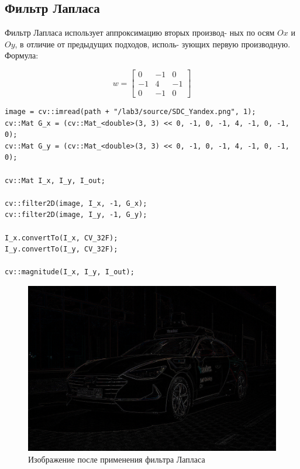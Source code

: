 \pagebreak

\subsection{Фильтр Лапласа}

Фильтр Лапласа использует аппроксимацию вторых производ-
ных по осям $Ox$ и $Oy$, в отличие от предыдущих подходов, исполь-
зующих первую производную. Формула:

\begin{equation}
    w = \begin{bmatrix}
        0 & -1 & 0 \\
        -1 & 4 & -1 \\
        0 & -1 & 0
    \end{bmatrix}
\end{equation}

\begin{lstlisting}[style=cpp_white, caption={Исходный код фильтра Лапласа}]
image = cv::imread(path + "/lab3/source/SDC_Yandex.png", 1);
cv::Mat G_x = (cv::Mat_<double>(3, 3) << 0, -1, 0, -1, 4, -1, 0, -1, 0);
cv::Mat G_y = (cv::Mat_<double>(3, 3) << 0, -1, 0, -1, 4, -1, 0, -1, 0);

cv::Mat I_x, I_y, I_out;

cv::filter2D(image, I_x, -1, G_x);
cv::filter2D(image, I_y, -1, G_y);

I_x.convertTo(I_x, CV_32F);
I_y.convertTo(I_y, CV_32F);

cv::magnitude(I_x, I_y, I_out);
\end{lstlisting}

\begin{figure}[ht]
    \centering
    \includegraphics[width=\textwidth]{../outputs/laplas_operator.png}
    \caption{Изображение после применения фильтра Лапласа}
    \label{fig:stitch_images}
\end{figure}

